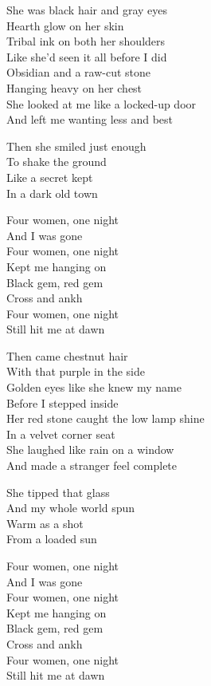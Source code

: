 \begin{lyrics}

She was black hair and gray eyes\\
Hearth glow on her skin\\
Tribal ink on both her shoulders\\
Like she'd seen it all before I did\\
Obsidian and a raw-cut stone\\
Hanging heavy on her chest\\
She looked at me like a locked-up door\\
And left me wanting less and best

Then she smiled just enough\\
To shake the ground\\
Like a secret kept\\
In a dark old town

Four women, one night\\
And I was gone\\
Four women, one night\\
Kept me hanging on\\
Black gem, red gem\\
Cross and ankh\\
Four women, one night\\
Still hit me at dawn

Then came chestnut hair\\
With that purple in the side\\
Golden eyes like she knew my name\\
Before I stepped inside\\
Her red stone caught the low lamp shine\\
In a velvet corner seat\\
She laughed like rain on a window\\
And made a stranger feel complete

She tipped that glass\\
And my whole world spun\\
Warm as a shot\\
From a loaded sun

Four women, one night\\
And I was gone\\
Four women, one night\\
Kept me hanging on\\
Black gem, red gem\\
Cross and ankh\\
Four women, one night\\
Still hit me at dawn


\end{lyrics}
